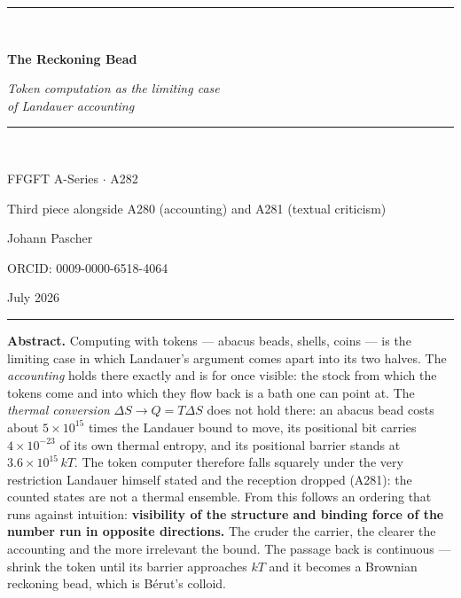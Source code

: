 \documentclass[11pt,a4paper]{article}
\begin{document}
\begin{titlepage}
\centering
\vspace*{2.2cm}
{\color{rulecol}\rule{0.5\textwidth}{0.6pt}}\\[1.4cm]
{\color{accent}\Huge\bfseries The Reckoning Bead\par}
\vspace{1.0cm}
{\large\itshape Token computation as the limiting case\\ of Landauer accounting\par}
\vspace{0.6cm}
{\color{accent2}\rule{0.28\textwidth}{0.4pt}}\\[1.0cm]
{\large FFGFT A-Series $\cdot$ A282\par}
\vspace{0.4cm}
{\normalsize Third piece alongside A280 (accounting) and A281 (textual criticism)\par}
\vfill
{\large Johann Pascher\par}
\vspace{0.3cm}
{\footnotesize ORCID: 0009-0000-6518-4064\par}
\vspace{0.2cm}
{\footnotesize July 2026\par}
\vspace{1.4cm}
{\color{rulecol}\rule{0.5\textwidth}{0.6pt}}
\vspace*{1.5cm}
\end{titlepage}

\tableofcontents
\thispagestyle{fancy}
\clearpage

\begingroup\small\noindent
\textbf{Abstract.} Computing with tokens --- abacus beads, shells, coins --- is
the limiting case in which Landauer's argument comes apart into its two halves.
The \emph{accounting} holds there exactly and is for once visible: the stock from
which the tokens come and into which they flow back is a bath one can point at.
The \emph{thermal conversion} $\Delta S \to Q = T\Delta S$ does not hold there: an
abacus bead costs about $5\times10^{15}$ times the Landauer bound to move, its
positional bit carries $4\times10^{-23}$ of its own thermal entropy, and its
positional barrier stands at $3.6\times10^{15}\,kT$. The token computer therefore
falls squarely under the very restriction Landauer himself stated and the
reception dropped (A281): the counted states are not a thermal ensemble. From
this follows an ordering that runs against intuition: \textbf{visibility of the
structure and binding force of the number run in opposite directions.} The cruder
the carrier, the clearer the accounting and the more irrelevant the bound. The
passage back is continuous --- shrink the token until its barrier approaches
$kT$ and it becomes a Brownian reckoning bead, which is Bérut's colloid.
\par\endgroup
\end{document}
